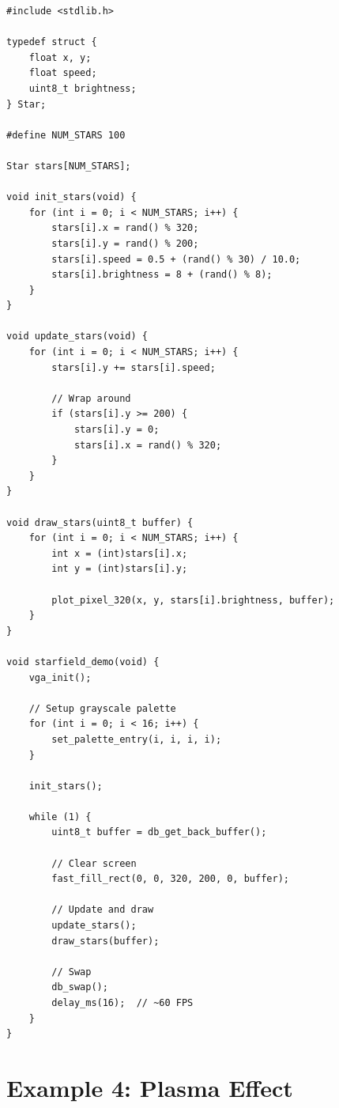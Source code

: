 \documentclass[11pt,letterpaper]{report}
\begin{document}
\begin{lstlisting}[style=c,caption={Scrolling Starfield}]
#include <stdlib.h>

typedef struct {
    float x, y;
    float speed;
    uint8_t brightness;
} Star;

#define NUM_STARS 100

Star stars[NUM_STARS];

void init_stars(void) {
    for (int i = 0; i < NUM_STARS; i++) {
        stars[i].x = rand() % 320;
        stars[i].y = rand() % 200;
        stars[i].speed = 0.5 + (rand() % 30) / 10.0;
        stars[i].brightness = 8 + (rand() % 8);
    }
}

void update_stars(void) {
    for (int i = 0; i < NUM_STARS; i++) {
        stars[i].y += stars[i].speed;
        
        // Wrap around
        if (stars[i].y >= 200) {
            stars[i].y = 0;
            stars[i].x = rand() % 320;
        }
    }
}

void draw_stars(uint8_t buffer) {
    for (int i = 0; i < NUM_STARS; i++) {
        int x = (int)stars[i].x;
        int y = (int)stars[i].y;
        
        plot_pixel_320(x, y, stars[i].brightness, buffer);
    }
}

void starfield_demo(void) {
    vga_init();
    
    // Setup grayscale palette
    for (int i = 0; i < 16; i++) {
        set_palette_entry(i, i, i, i);
    }
    
    init_stars();
    
    while (1) {
        uint8_t buffer = db_get_back_buffer();
        
        // Clear screen
        fast_fill_rect(0, 0, 320, 200, 0, buffer);
        
        // Update and draw
        update_stars();
        draw_stars(buffer);
        
        // Swap
        db_swap();
        delay_ms(16);  // ~60 FPS
    }
}
\end{lstlisting}

\section{Example 4: Plasma Effect}
\end{document}
